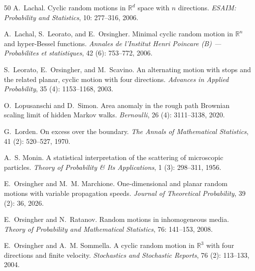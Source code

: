 \documentclass[10pt]{article}
\newcommand{\1}{1\!\!\!\;{\rm I}}
\theoremstyle{plain}
\theoremstyle{definition}
\numberwithin{equation}{section}
\begin{document}
\begin{thebibliography}{50}
A.~Lachal.
\newblock Cyclic random motions in $\mathbb{R}^d$ space with $n$ directions.
\newblock \emph{ESAIM: Probability and Statistics}, 10: 277--316,
  2006.

A.~Lachal, S.~Leorato, and E.~Orsingher.
\newblock Minimal cyclic random motion in $\mathbb{R}^n$ and hyper-{B}essel
  functions.
\newblock \emph{Annales de l'Institut Henri Poincare (B) --- Probabilites et
  statistiques}, 42 (6): 753--772, 2006.

S.~Leorato, E.~Orsingher, and M.~Scavino.
\newblock An alternating motion with stops and the related planar, cyclic
  motion with four directions.
\newblock \emph{Advances in Applied Probability}, 35 (4):
  1153--1168, 2003.

O.~Lopusanschi and D.~Simon.
\newblock Area anomaly in the rough path {B}rownian scaling limit of hidden
  {M}arkov walks.
\newblock \emph{Bernoulli}, 26 (4): 3111--3138, 2020.

G.~Lorden.
\newblock On excess over the boundary.
\newblock \emph{The Annals of Mathematical Statistics}, 41
  (2): 520--527, 1970.

A.~S. Monin.
\newblock A statistical interpretation of the scattering of microscopic
  particles.
\newblock \emph{Theory of Probability \& Its Applications}, 1
  (3): 298--311, 1956.

E.~Orsingher and M.~M. Marchione.
\newblock One-dimensional and planar random motions with variable propagation
  speeds.
\newblock \emph{Journal of Theoretical Probability}, 39 (2):
  36, 2026.

E.~Orsingher and N.~Ratanov.
\newblock Random motions in inhomogeneous media.
\newblock \emph{Theory of Probability and Mathematical Statistics},
  76: 141--153, 2008.

E.~Orsingher and A.~M. Sommella.
\newblock A cyclic random motion in $\mathbb{R}^3$ with four directions and
  finite velocity.
\newblock \emph{Stochastics and Stochastic Reports}, 76 (2):
  113--133, 2004.


\end{thebibliography}
\end{document}

